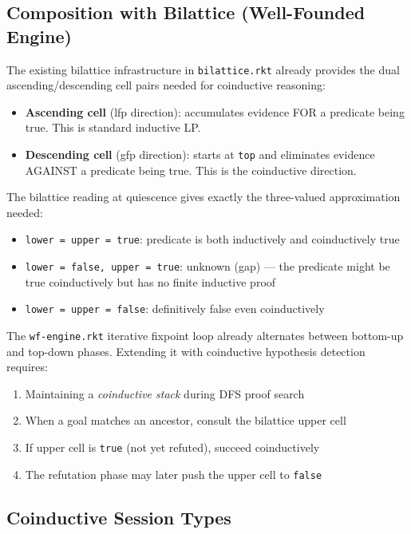\documentclass[11pt]{article}
\begin{document}
\subsection{Composition with Bilattice (Well-Founded Engine)}
\label{sec:org01b6ede}

The existing bilattice infrastructure in \texttt{bilattice.rkt} already provides the
dual ascending/descending cell pairs needed for coinductive reasoning:

\begin{itemize}
\item \textbf{Ascending cell} (lfp direction): accumulates evidence FOR a predicate being
true. This is standard inductive LP.
\item \textbf{Descending cell} (gfp direction): starts at \texttt{top} and eliminates evidence
AGAINST a predicate being true. This is the coinductive direction.
\end{itemize}

The bilattice reading at quiescence gives exactly the three-valued approximation
needed:
\begin{itemize}
\item \texttt{lower = upper = true}: predicate is both inductively and coinductively true
\item \texttt{lower = false, upper = true}: unknown (gap) --- the predicate might be true
coinductively but has no finite inductive proof
\item \texttt{lower = upper = false}: definitively false even coinductively
\end{itemize}

The \texttt{wf-engine.rkt} iterative fixpoint loop already alternates between bottom-up
and top-down phases. Extending it with coinductive hypothesis detection requires:

\begin{enumerate}
\item Maintaining a \emph{coinductive stack} during DFS proof search
\item When a goal matches an ancestor, consult the bilattice upper cell
\item If upper cell is \texttt{true} (not yet refuted), succeed coinductively
\item The refutation phase may later push the upper cell to \texttt{false}
\end{enumerate}
\subsection{Coinductive Session Types}
\label{sec:org11fad71}
\end{document}
